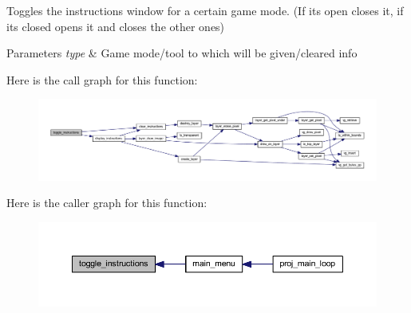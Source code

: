 Toggles the instructions window for a certain game mode. (If it\textquotesingle{}s open closes it, if it\textquotesingle{}s closed opens it and closes the other ones) 


\begin{DoxyParams}{Parameters}
{\em type} & Game mode/tool to which will be given/cleared info \\
\hline
\end{DoxyParams}
Here is the call graph for this function\+:\nopagebreak
\begin{figure}[H]
\begin{center}
\leavevmode
\includegraphics[width=350pt]{group__game__info_gaa555b2189fe80ff7c8095d0c80353c2d_cgraph}
\end{center}
\end{figure}
Here is the caller graph for this function\+:\nopagebreak
\begin{figure}[H]
\begin{center}
\leavevmode
\includegraphics[width=350pt]{group__game__info_gaa555b2189fe80ff7c8095d0c80353c2d_icgraph}
\end{center}
\end{figure}

